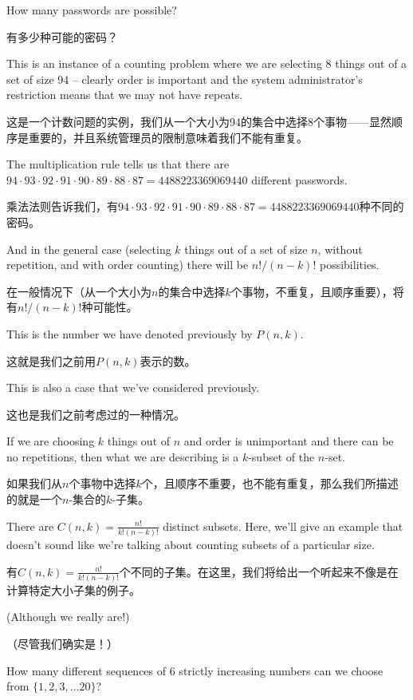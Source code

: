 How many passwords are possible?    

有多少种可能的密码？

This is an instance of a counting problem where we are selecting 8 things
out of a set of size 94 -- clearly order is important and the system 
administrator's restriction means that we may not have repeats.

这是一个计数问题的实例，我们从一个大小为94的集合中选择8个事物——显然顺序是重要的，并且系统管理员的限制意味着我们不能有重复。

The multiplication rule tells us that there are 
$94\cdot 93\cdot 92\cdot 91\cdot 90\cdot 89\cdot 88\cdot 87 = 4488223369069440$
different passwords.

乘法法则告诉我们，有$94\cdot 93\cdot 92\cdot 91\cdot 90\cdot 89\cdot 88\cdot 87 = 4488223369069440$种不同的密码。

And in the general case (selecting $k$ things out 
of a set of size $n$, without repetition, and with order counting) 
there will be $n!/(n-k)!$ possibilities.

在一般情况下（从一个大小为$n$的集合中选择$k$个事物，不重复，且顺序重要），将有$n!/(n-k)!$种可能性。

This is the number we have 
denoted previously by $P(n,k)$.

这就是我们之前用$P(n,k)$表示的数。


This is also a case that we've considered previously.

这也是我们之前考虑过的一种情况。

If we are choosing
$k$ things out of $n$ and order is unimportant and there can be no 
repetitions, then what we are describing is a $k$-subset of the 
$n$-set.

如果我们从$n$个事物中选择$k$个，且顺序不重要，也不能有重复，那么我们所描述的就是一个$n$-集合的$k$-子集。

There are $C(n,k) = \frac{n!}{k!(n-k)!}$ distinct subsets.
Here, we'll give an example that doesn't sound like we're talking
about counting subsets of a particular size.

有$C(n,k) = \frac{n!}{k!(n-k)!}$个不同的子集。在这里，我们将给出一个听起来不像是在计算特定大小子集的例子。

(Although we really are!)

（尽管我们确实是！）

How many different sequences of 6 strictly increasing numbers can 
we choose from $\{1, 2, 3, \ldots 20\}$?

